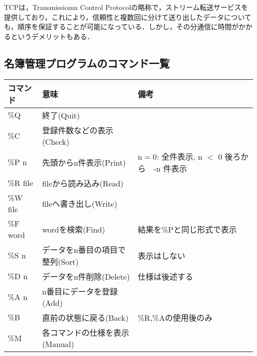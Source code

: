 \documentclass[a4j]{jarticle}
\begin{document}
TCPは，Transmissiomn Control Protocolの略称で，ストリーム転送サービスを提供しており，これにより，信頼性と複数回に分けて送り出したデータについても，順序を保証することが可能になっている．しかし，その分通信に時間がかかるというデメリットもある．

\subsection{名簿管理プログラムのコマンド一覧}

      \begin{tabular}{|l|l|l|}
        \hline
        コマンド& 意味& 備考\\
        \hline
        \%Q & 終了(Quit)& \\
        \hline
        \%C & 登録件数などの表示(Check)& \\
        \hline
        \%P n& 先頭からn件表示(Print)& n$=$0: 全件表示, n $<$ 0 後ろから　-n 件表示\\
        \hline
        \%R file& fileから読み込み(Read)& \\
        \hline
        \%W file & fileへ書き出し(Write)& \\
        \hline
        \%F word& wordを検索(Find)& 結果を\%Pと同じ形式で表示 \\
        \hline
        \%S n& データをn番目の項目で整列(Sort)& 表示はしない\\
        \hline
        \%D n& データをn件削除(Delete)& 仕様は後述する \\
        \hline
        \%A n& n番目にデータを登録(Add)& \\
        \hline
        \%B & 直前の状態に戻る(Back)& \%R,\%Aの使用後のみ\\
        \hline
        \%M & 各コマンドの仕様を表示(Manual)& \\
        \hline
      \end{tabular}
      
\end{document}
